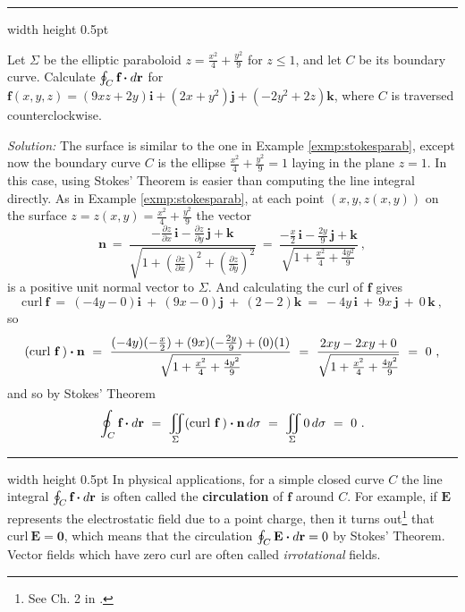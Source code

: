 \medskip
\hrule width \textwidth height 0.5pt
\begin{exmp}
 Let $\Sigma$ be the elliptic paraboloid $z=\frac{x^2}{4}+\frac{y^2}{9}$ for $z \le 1$, and let $C$ be its boundary
 curve.
 Calculate $\oint_{C} \textbf{f} \bm{\cdot} d\textbf{r}$ for $\mathbf{f}(x,y,z)=(9xz+2y)\mathbf{i}+(2x+y^2 )\mathbf{j}+(-2y^2 +2z)\mathbf{k}$,
 where $C$ is traversed counterclockwise.\smallskip
 \par\noindent\emph{Solution:} The surface is similar to the one in Example \ref{exmp:stokesparab}, except now the
 boundary curve $C$ is the ellipse $\frac{x^2}{4}+\frac{y^2}{9}=1$ laying in the plane $z=1$. 
 In this case, using Stokes' Theorem is easier than computing the line integral directly. 
 As in Example \ref{exmp:stokesparab}, at each
 point $(x,y,z(x,y))$ on the surface $z=z(x,y)=\frac{x^2}{4}+\frac{y^2}{9}$ the vector
 \begin{displaymath}
  \mathbf{n} ~=~
   \frac{-\frac{\partial z}{\partial x}\,\mathbf{i} - \frac{\partial z}{\partial y}\,\mathbf{j} +
   \mathbf{k}}{\sqrt{1 + \left( \tfrac{\partial z}{\partial x} \right)^2 +
   \left( \tfrac{\partial z}{\partial y} \right)^2}} ~=~
   \frac{-\tfrac{x}{2}\,\mathbf{i} - \tfrac{2y}{9}\,\mathbf{j} + \mathbf{k}}{\sqrt{1 +\tfrac{x^2}{4}+
    \tfrac{4y^2}{9}}} ~,
 \end{displaymath}
 is a positive unit normal vector to $\Sigma$. And calculating the curl of $\mathbf{f}$ gives
 \begin{displaymath}
  \text{curl}~\mathbf{f} ~=~ (-4y-0)\mathbf{i} ~+~ (9x-0)\mathbf{j} ~+~ (2-2)\mathbf{k} ~=~ -4y\,\mathbf{i} ~+~ 9x\,\mathbf{j} ~+~
   0\,\mathbf{k}~,
 \end{displaymath}
 so
 \begin{displaymath}
  (\text{curl}~{\mathbf{f}}\,) \bm{\cdot} \mathbf{n} ~=~ \frac{(-4y)(-\tfrac{x}{2})+(9x)(-\tfrac{2y}{9})+
   (0)(1)}{\sqrt{1 +\tfrac{x^2}{4}+\tfrac{4y^2}{9}}} ~=~ \frac{2xy-2xy+0}{\sqrt{1 +\tfrac{x^2}{4}+\tfrac{4y^2}{9}}} ~=~ 0~,
 \end{displaymath}
 and so by Stokes' Theorem
 \begin{displaymath}
  \oint_{C} \textbf{f} \bm{\cdot} d\textbf{r} ~=~ \iint\limits_{\Sigma} (\text{curl}~{\mathbf{f}}\,) \bm{\cdot} \mathbf{n}\,d\sigma ~=~
   \iint\limits_{\Sigma} 0\,d\sigma ~=~ 0 ~.
 \end{displaymath}
\end{exmp}
\hrule width \textwidth height 0.5pt
\smallskip
In physical applications, for a simple closed curve $C$ the line integral $\oint_{C} \textbf{f} \bm{\cdot} d\textbf{r}$
is often called the \textbf{circulation} of $\mathbf{f}$ around $C$. For example, if $\mathbf{E}$
represents the electrostatic field due to a point charge, then
it turns out\footnote{See Ch. 2 in \cite{rmc}.} that $\text{curl}~\mathbf{E} = \mathbf{0}$, which means that the
circulation $\oint_{C} \textbf{E} \bm{\cdot} d\textbf{r}=0$ by Stokes' Theorem. Vector fields which have zero curl are often called
\emph{irrotational} fields.

